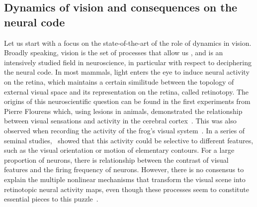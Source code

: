 \documentclass[brainsci, %
               review,submit,pdftex,moreauthors
               ]{Definitions/mdpi}
\begin{document}
\subsection{Dynamics of vision and consequences on the neural code}%
%
Let us start with a focus on the state-of-the-art of the role of dynamics in vision. Broadly speaking, vision is the set of processes that allow us , and is an intensively studied field in neuroscience, in particular with respect to deciphering the neural code. In most mammals, light enters the eye to induce neural activity on the retina, which maintains a certain similitude between the topology of external visual space and its representation on the retina, called retinotopy. The origins of this neuroscientific question can be found in the first experiments from Pierre Flourens which, using lesions in animals, demonstrated the relationship between visual sensations and activity in the cerebral cortex~\citep{flourens_recherches_1842,pearce_marie-jean-pierre_2009}. This was also observed  when recording the activity of the frog's visual system~\citep{adrian_impulses_1926}. In a series of seminal studies,~\citet{hubel_receptive_1968} showed that this activity could be selective to different features, such as the visual orientation or motion of elementary contours. For a large proportion of neurons, there is  relationship between the contrast of visual features and the firing frequency of neurons. However, there is no consensus to explain the multiple nonlinear mechanisms that transform the visual scene into retinotopic neural activity maps, even though these processes seem to constitute essential pieces to this puzzle~\citep{carandini_normalization_2012}. 
\end{document}

